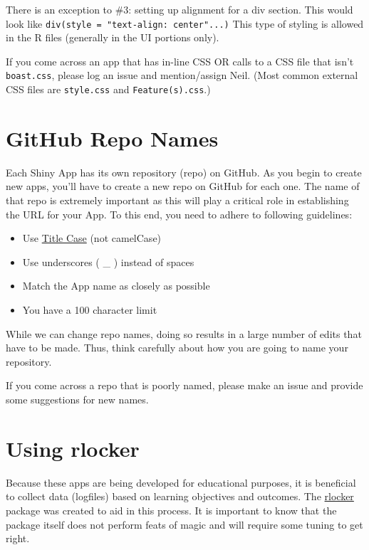 \documentclass[
]{book}
\providecommand{\tightlist}{%
  \setlength{\itemsep}{0pt}\setlength{\parskip}{0pt}}
\begin{document}
There is an exception to \#3: setting up alignment for a div section. This would look like \texttt{div(style\ =\ "text-align:\ center"...)} This type of styling is allowed in the R files (generally in the UI portions only).

If you come across an app that has in-line CSS OR calls to a CSS file that isn't \texttt{boast.css}, please log an issue and mention/assign Neil. (Most common external CSS files are \texttt{style.css} and \texttt{Feature(s).css}.)

\hypertarget{repo-naming}{%
\section{GitHub Repo Names}\label{repo-naming}}

Each Shiny App has its own repository (repo) on GitHub. As you begin to create new apps, you'll have to create a new repo on GitHub for each one. The name of that repo is extremely important as this will play a critical role in establishing the URL for your App. To this end, you need to adhere to following guidelines:

\begin{itemize}
\tightlist
\item
  Use \href{https://en.wikipedia.org/wiki/Letter_case\#Title_case}{Title Case} (not camelCase)
\item
  Use underscores ( \_ ) instead of spaces
\item
  Match the App name as closely as possible
\item
  You have a 100 character limit
\end{itemize}

While we can change repo names, doing so results in a large number of edits that have to be made. Thus, think carefully about how you are going to name your repository.

If you come across a repo that is poorly named, please make an issue and provide some suggestions for new names.

\hypertarget{rlocker}{%
\section{Using rlocker}\label{rlocker}}

Because these apps are being developed for educational purposes, it is beneficial to collect data (logfiles) based on learning objectives and outcomes. The \href{https://github.com/rpc5102/rlocker}{rlocker} package was created to aid in this process. It is important to know that the package itself does not perform feats of magic and will require some tuning to get right.
\end{document}
